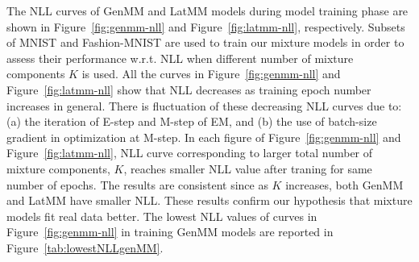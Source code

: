 The NLL curves of GenMM and LatMM models during model training phase are shown in Figure~\ref{fig:genmm-nll} and Figure~\ref{fig:latmm-nll}, respectively. Subsets of MNIST and Fashion-MNIST are used to train our mixture models in order to assess their performance w.r.t. NLL when different number of mixture components $K$ is used. All the curves in Figure~\ref{fig:genmm-nll} and Figure~\ref{fig:latmm-nll} show that NLL decreases as training epoch number increases in general. There is fluctuation of these decreasing NLL curves due to: (a) the iteration of E-step and M-step of EM, and (b) the use of batch-size gradient in optimization at M-step. In each figure of Figure~\ref{fig:genmm-nll} and Figure~\ref{fig:latmm-nll}, NLL curve corresponding to larger total number of mixture components, $K$, reaches smaller NLL value after traning for same number of epochs. The results are consistent since as $K$ increases, both GenMM and LatMM have smaller NLL. These results confirm our hypothesis that mixture models fit real data better. The lowest NLL values of curves in Figure~\ref{fig:genmm-nll} in training GenMM models are reported in Figure~\ref{tab:lowestNLLgenMM}.

